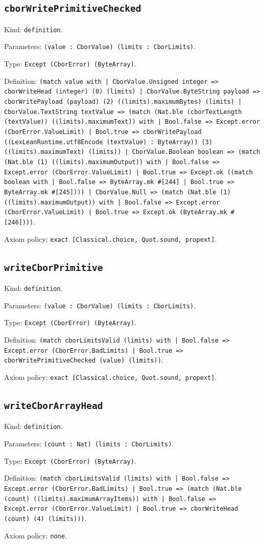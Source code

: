 \documentclass[11pt]{article}
\begin{document}
\subsection*{\texttt{cborWritePrimitiveChecked}}
\noindent Kind: \texttt{definition}.\par
\noindent Parameters: \texttt{(value : CborValue) (limits : CborLimits)}.\par
\noindent Type: \texttt{Except (CborError) (ByteArray)}.\par
\noindent Definition: \texttt{(match value with | CborValue.Unsigned integer => cborWriteHead (integer) (0) (limits) | CborValue.ByteString payload => cborWritePayload (payload) (2) ((limits).maximumBytes) (limits) | CborValue.TextString textValue => (match (Nat.ble (cborTextLength (textValue)) ((limits).maximumText)) with | Bool.false => Except.error (CborError.ValueLimit) | Bool.true => cborWritePayload ((LexLeanRuntime.utf8Encode (textValue) : ByteArray)) (3) ((limits).maximumText) (limits)) | CborValue.Boolean boolean => (match (Nat.ble (1) ((limits).maximumOutput)) with | Bool.false => Except.error (CborError.ValueLimit) | Bool.true => Except.ok ((match boolean with | Bool.false => ByteArray.mk \#[244] | Bool.true => ByteArray.mk \#[245]))) | CborValue.Null => (match (Nat.ble (1) ((limits).maximumOutput)) with | Bool.false => Except.error (CborError.ValueLimit) | Bool.true => Except.ok (ByteArray.mk \#[246])))}.\par
\noindent Axiom policy: \texttt{exact [Classical.choice, Quot.sound, propext]}.\par
\subsection*{\texttt{writeCborPrimitive}}
\noindent Kind: \texttt{definition}.\par
\noindent Parameters: \texttt{(value : CborValue) (limits : CborLimits)}.\par
\noindent Type: \texttt{Except (CborError) (ByteArray)}.\par
\noindent Definition: \texttt{(match cborLimitsValid (limits) with | Bool.false => Except.error (CborError.BadLimits) | Bool.true => cborWritePrimitiveChecked (value) (limits))}.\par
\noindent Axiom policy: \texttt{exact [Classical.choice, Quot.sound, propext]}.\par
\subsection*{\texttt{writeCborArrayHead}}
\noindent Kind: \texttt{definition}.\par
\noindent Parameters: \texttt{(count : Nat) (limits : CborLimits)}.\par
\noindent Type: \texttt{Except (CborError) (ByteArray)}.\par
\noindent Definition: \texttt{(match cborLimitsValid (limits) with | Bool.false => Except.error (CborError.BadLimits) | Bool.true => (match (Nat.ble (count) ((limits).maximumArrayItems)) with | Bool.false => Except.error (CborError.ValueLimit) | Bool.true => cborWriteHead (count) (4) (limits)))}.\par
\noindent Axiom policy: \texttt{none}.\par
\end{document}

